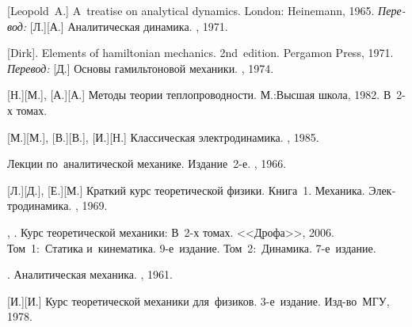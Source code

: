\begin{thebibliography}{123}
\begin{otherlanguage}{russian}

[Leopold~A.] A~treatise on analytical dynamics.
London: Heinemann, 1965. 
\emph{Перевод:} [Л.][А.] Аналитическая динамика. \naukapublisher, 1971. 

[Dirk]. Elements of hamiltonian mechanics. 2nd~edition. Pergamon Press, 1971. 
\emph{Перевод:} [Д.] Основы гамильтоновой механики. \naukapublisher, 1974. 

[Н.][М.], [А.][А.] Методы теории теплопроводности. М.:\;Высшая школа, 1982. В~2\hbox{-}х томах.

[М.][М.], [В.][В.], [И.][Н.] Классическая электродинамика. \naukapublisher, 1985. 

Лекции по~аналитической механике.
Издание~2\hbox{-}е.
\naukapublisher, 1966.

[Л.][Д.], [Е.][М.] Краткий курс теоретической физики. Книга~1. Механика. Электродинамика. \naukapublisher, 1969. 

, . Курс теоретической механики: В~2\hbox{-}х томах.
<<Дрофа>>, 2006.
%
Том~1:~Статика и~кинематика.
9\hbox{-}е~издание.
%
Том~2:~Динамика.
7\hbox{-}е~издание.

.
Аналитическая механика.
\fizmatgiz, 1961.

[И.][И.] Курс теоретической механики для~физиков. 3\hbox{-}е~издание. Изд\hbox{-}во~МГУ, 1978. 


\end{otherlanguage}
\end{thebibliography}
